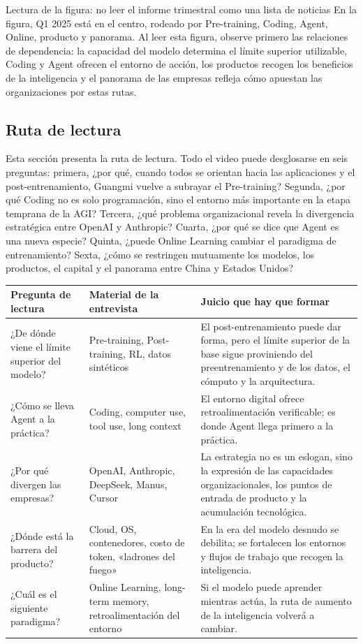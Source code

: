 \documentclass[a4paper]{article}
\begin{document}
\begin{knowledgebox}{Lectura de la figura: no leer el informe trimestral como una lista de noticias}
En la figura, Q1 2025 está en el centro, rodeado por Pre-training, Coding, Agent, Online, producto y panorama. Al leer esta figura, observe primero las relaciones de dependencia: la capacidad del modelo determina el límite superior utilizable, Coding y Agent ofrecen el entorno de acción, los productos recogen los beneficios de la inteligencia y el panorama de las empresas refleja cómo apuestan las organizaciones por estas rutas.
\end{knowledgebox}

\subsection{Ruta de lectura}

Esta sección presenta la ruta de lectura. Todo el video puede desglosarse en seis preguntas: primera, ¿por qué, cuando todos se orientan hacia las aplicaciones y el post-entrenamiento, Guangmi vuelve a subrayar el Pre-training? Segunda, ¿por qué Coding no es solo programación, sino el entorno más importante en la etapa temprana de la AGI? Tercera, ¿qué problema organizacional revela la divergencia estratégica entre OpenAI y Anthropic? Cuarta, ¿por qué se dice que Agent es una nueva especie? Quinta, ¿puede Online Learning cambiar el paradigma de entrenamiento? Sexta, ¿cómo se restringen mutuamente los modelos, los productos, el capital y el panorama entre China y Estados Unidos?

\noindent\begin{tabularx}{\textwidth}{p{}p{}X}
\toprule
Pregunta de lectura & Material de la entrevista & Juicio que hay que formar \\
\midrule
¿De dónde viene el límite superior del modelo? & Pre-training, Post-training, RL, datos sintéticos & El post-entrenamiento puede dar forma, pero el límite superior de la base sigue proviniendo del preentrenamiento y de los datos, el cómputo y la arquitectura. \\
¿Cómo se lleva Agent a la práctica? & Coding, computer use, tool use, long context & El entorno digital ofrece retroalimentación verificable; es donde Agent llega primero a la práctica. \\
¿Por qué divergen las empresas? & OpenAI, Anthropic, DeepSeek, Manus, Cursor & La estrategia no es un eslogan, sino la expresión de las capacidades organizacionales, los puntos de entrada de producto y la acumulación tecnológica. \\
¿Dónde está la barrera del producto? & Cloud, OS, contenedores, costo de token, «ladrones del fuego» & En la era del modelo desnudo se debilita; se fortalecen los entornos y flujos de trabajo que recogen la inteligencia. \\
¿Cuál es el siguiente paradigma? & Online Learning, long-term memory, retroalimentación del entorno & Si el modelo puede aprender mientras actúa, la ruta de aumento de la inteligencia volverá a cambiar. \\
\bottomrule
\end{tabularx}
\end{document}
